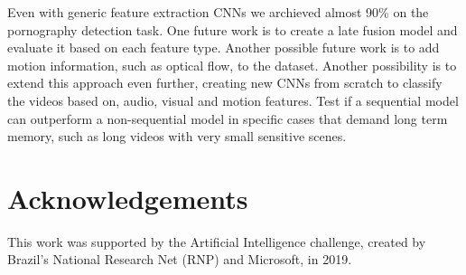 Even with generic feature extraction CNNs we archieved almost 90\% on the pornography detection task. 
One future work is to create a late fusion model and evaluate it based on each feature type.
Another possible future work is to add motion information, such as optical flow, to the dataset.
Another possibility is to extend this approach even further, creating new CNNs from scratch to classify the videos based on, audio, visual and motion features.
Test if a sequential model can outperform a non-sequential model in specific cases that demand long term memory, such as long videos with very small sensitive scenes.

\section{Acknowledgements}
\label{sec:acks}
This work was supported by the Artificial Intelligence challenge, created by Brazil's National Research Net (RNP) and Microsoft, in 2019.